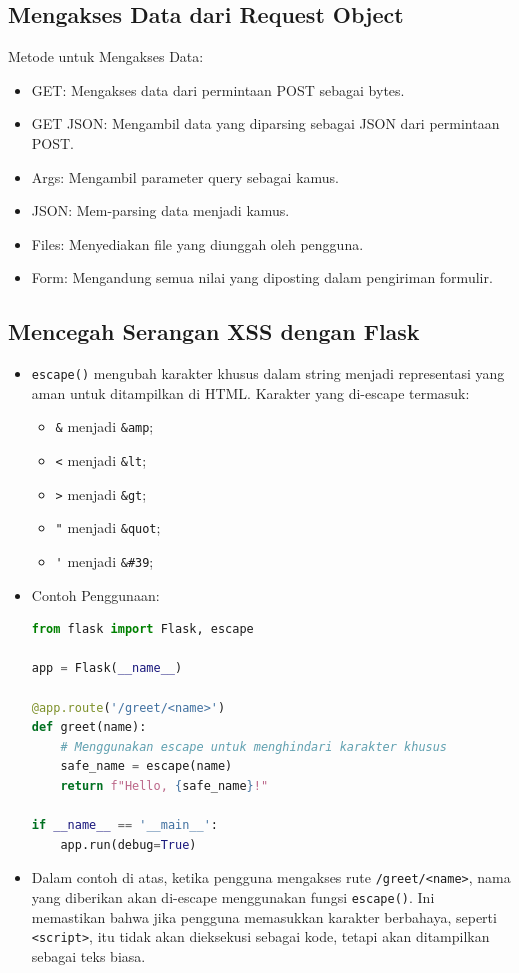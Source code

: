 \documentclass{article}
\begin{document}
\subsection{Mengakses Data dari Request Object}
Metode untuk Mengakses Data:
\begin{itemize}
    \item GET\@: Mengakses data dari permintaan POST sebagai bytes.
    \item GET JSON\@: Mengambil data yang diparsing sebagai JSON dari permintaan POST\@.
    \item Args: Mengambil parameter query sebagai kamus.
    \item JSON\@: Mem-parsing data menjadi kamus.
    \item Files: Menyediakan file yang diunggah oleh pengguna.
    \item Form: Mengandung semua nilai yang diposting dalam pengiriman formulir.
\end{itemize}

\subsection{Mencegah Serangan XSS dengan Flask}
\begin{itemize}
    \item \verb|escape()| mengubah karakter khusus dalam string menjadi representasi yang aman untuk ditampilkan di HTML. Karakter yang di-escape termasuk:
          \begin{itemize}
              \item \verb|&| menjadi \verb|&amp|;
              \item \verb|<| menjadi \verb|&lt|;
              \item \verb|>| menjadi \verb|&gt|;
              \item \verb|"| menjadi \verb|&quot|;
              \item \verb|'| menjadi \verb|&#39|;
          \end{itemize}
    \item Contoh Penggunaan:
          \begin{lstlisting}[language=Python, caption={}, captionpos=b]
from flask import Flask, escape

app = Flask(__name__)

@app.route('/greet/<name>')
def greet(name):
    # Menggunakan escape untuk menghindari karakter khusus
    safe_name = escape(name)
    return f"Hello, {safe_name}!"

if __name__ == '__main__':
    app.run(debug=True)
          \end{lstlisting}
    \item Dalam contoh di atas, ketika pengguna mengakses rute \verb|/greet/<name>|, nama yang diberikan akan di-escape menggunakan fungsi \verb|escape()|. Ini memastikan bahwa jika pengguna memasukkan karakter berbahaya, seperti \verb|<script>|, itu tidak akan dieksekusi sebagai kode, tetapi akan ditampilkan sebagai teks biasa.
\end{itemize}
\end{document}
